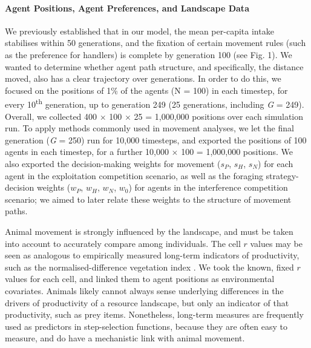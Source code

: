     \paragraph*{Agent Positions, Agent Preferences, and Landscape Data}
    
    We previously established that in our model, the mean per-capita intake stabilises within 50 generations, and the fixation of certain movement rules (such as the preference for handlers) is complete by generation 100 (see Fig. 1).
    We wanted to determine whether agent path structure, and specifically, the distance moved, also has a clear trajectory over generations.
    In order to do this, we focused on the positions of 1\% of the agents (N = 100) in each timestep, for every 10\textsuperscript{th} generation, up to generation 249 (25 generations, including \textit{G} = 249).
    Overall, we collected 400 $\times$ 100 $\times$ 25 = 1,000,000 positions over each simulation run.
    To apply methods commonly used in movement analyses, we let the final generation (\textit{G} = 250) run for 10,000 timesteps, and exported the positions of 100 agents in each timestep, for a further 10,000 $\times$ 100 = 1,000,000 positions.
    We also exported the decision-making weights for movement ($s_P$, $s_H$, $s_N$) for each agent in the exploitation competition scenario, as well as the foraging strategy-decision weights ($w_P$, $w_H$, $w_N$, $w_0$) for agents in the interference competition scenario; we aimed to later relate these weights to the structure of movement paths.
    
    Animal movement is strongly influenced by the landscape, and must be taken into account to accurately compare among individuals.
    The cell $r$ values may be seen as analogous to empirically measured long-term indicators of productivity, such as the normalised-difference vegetation index \citep[NDVI;][]{pettorelli2011}.
    We took the known, fixed $r$ values for each cell, and linked them to agent positions as environmental covariates.
    Animals likely cannot always sense underlying differences in the drivers of productivity of a resource landscape, but only an indicator of that productivity, such as prey items.
    Nonetheless, long-term measures are frequently used as predictors in step-selection functions, because they are often easy to measure, and do have a mechanistic link with animal movement.
    
